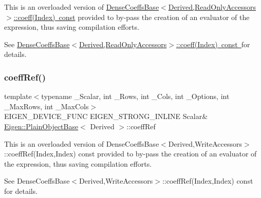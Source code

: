 This is an overloaded version of \mbox{\hyperlink{class_eigen_1_1_dense_coeffs_base_3_01_derived_00_01_read_only_accessors_01_4_ad52344ad1f42852db71996590d2de0de}{Dense\+Coeffs\+Base$<$\+Derived,\+Read\+Only\+Accessors$>$\+::coeff(\+Index) const}} provided to by-\/pass the creation of an evaluator of the expression, thus saving compilation efforts.

See \mbox{\hyperlink{class_eigen_1_1_dense_coeffs_base_3_01_derived_00_01_read_only_accessors_01_4_ad52344ad1f42852db71996590d2de0de}{Dense\+Coeffs\+Base$<$\+Derived,\+Read\+Only\+Accessors$>$\+::coeff(\+Index) const }}for details. \mbox{\label{class_eigen_1_1_array_a25626a55b26a4323565f79d1b7c48ea8}} 
\subsubsection{\texorpdfstring{coeffRef()}{coeffRef()}\hspace{0.1cm}{\footnotesize\ttfamily [1/4]}}
{\footnotesize\ttfamily template$<$typename \+\_\+\+Scalar, int \+\_\+\+Rows, int \+\_\+\+Cols, int \+\_\+\+Options, int \+\_\+\+Max\+Rows, int \+\_\+\+Max\+Cols$>$ \\
E\+I\+G\+E\+N\+\_\+\+D\+E\+V\+I\+C\+E\+\_\+\+F\+U\+NC E\+I\+G\+E\+N\+\_\+\+S\+T\+R\+O\+N\+G\+\_\+\+I\+N\+L\+I\+NE Scalar\& \mbox{\hyperlink{class_eigen_1_1_plain_object_base}{Eigen\+::\+Plain\+Object\+Base}}$<$ Derived $>$\+::coeff\+Ref\hspace{0.3cm}{\ttfamily [inline]}}

This is an overloaded version of Dense\+Coeffs\+Base$<$\+Derived,\+Write\+Accessors$>$\+::coeff\+Ref(\+Index,\+Index) const provided to by-\/pass the creation of an evaluator of the expression, thus saving compilation efforts.

See Dense\+Coeffs\+Base$<$\+Derived,\+Write\+Accessors$>$\+::coeff\+Ref(\+Index,\+Index) const for details. \mbox{\label{class_eigen_1_1_array_a571632ed666076d7403c8bd3eece44f0}} 
